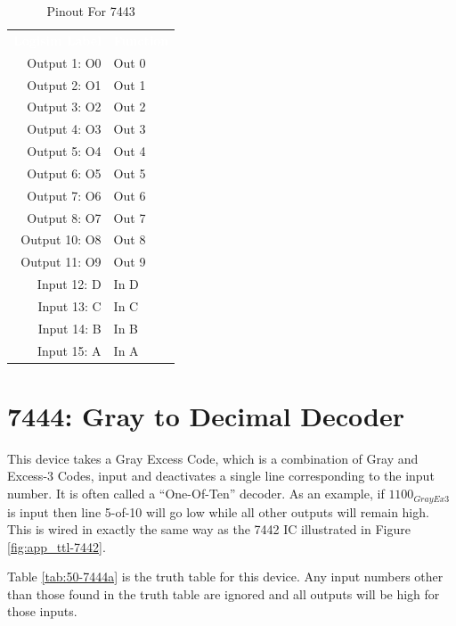 \begin{table}[H]
	\sffamily
	\newcommand{\head}[1]{\textcolor{white}{\textbf{#1}}}		
	\begin{center}
		\begin{tabular}{rl} 
			\rowcolor{black!75}
			\head{Logisim Label} & \head{Function} \\
			Output 1: O0  & Out 0 \\
			Output 2: O1  & Out 1 \\
			Output 3: O2  & Out 2 \\
			Output 4: O3  & Out 3 \\
			Output 5: O4  & Out 4 \\
			Output 6: O5  & Out 5 \\
			Output 7: O6  & Out 6 \\
			Output 8: O7  & Out 7 \\
			Output 10: O8 & Out 8 \\
			Output 11: O9 & Out 9 \\
			Input 12: D   & In D  \\
			Input 13: C   & In C  \\
			Input 14: B   & In B  \\
			Input 15: A   & In A  \\
		\end{tabular}
	\end{center}
	\caption{Pinout For 7443}
	\label{tab:50-7443b}
\end{table}

\section{7444: Gray to Decimal Decoder}

This device takes a Gray Excess Code, which is a combination of Gray and Excess-3 Codes, input and deactivates a single line corresponding to the input number. It is often called a ``One-Of-Ten'' decoder. As an example, if $ 1100_{GrayEx3} $ is input then line 5-of-10 will go low while all other outputs will remain high. This is wired in exactly the same way as the 7442 \ac{IC} illustrated in Figure \ref{fig:app_ttl-7442}.

Table \ref{tab:50-7444a} is the truth table for this device. Any input numbers other than those found in the truth table are ignored and all outputs will be high for those inputs.

